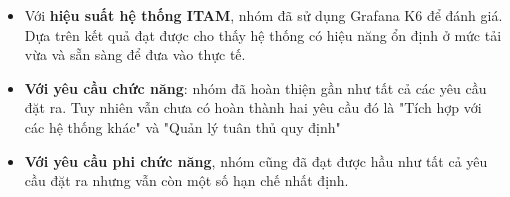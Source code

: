 \begin{itemize}[label=--]
\begin{itemize}[label=\textbullet]
    \end{itemize}
    \item Với \textbf{hiệu suất hệ thống ITAM}, nhóm đã sử dụng Grafana K6 để đánh giá. Dựa trên kết quả đạt được cho thấy hệ thống có hiệu năng ổn định ở mức tải vừa và sẵn sàng để đưa vào thực tế. 
    \item \textbf{Với yêu cầu chức năng}: nhóm đã hoàn thiện gần như tất cả các yêu cầu đặt ra. Tuy nhiên vẫn chưa có hoàn thành hai yêu cầu đó là "Tích hợp với các hệ thống khác" và "Quản lý tuân thủ quy định"
    \item \textbf{Với yêu cầu phi chức năng}, nhóm cũng đã đạt được hầu như tất cả yêu cầu đặt ra nhưng vẫn còn một số hạn chế nhất định.
\end{itemize}

